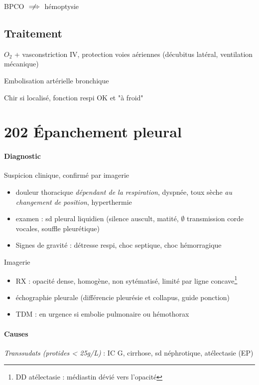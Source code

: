 \documentclass{book}
\begin{document}
\danger BPCO \(\centernot\implies\) hémoptysie

\subsection{Traitement}
\label{sec:orgaaabe04}
\(O_2\) + vasconstriction IV, protection voies aériennes (décubitus latéral,
ventilation mécanique)

Embolisation artérielle bronchique

Chir si localisé, fonction respi OK et "à froid"

\section{202 Épanchement pleural}
\label{sec:orgd27b8fa}
\paragraph{Diagnostic}
\label{sec:orgdda67ba}
Suspicion clinique, confirmé par imagerie
\begin{itemize}
\item douleur thoracique \emph{dépendant de la respiration}, dyspnée, toux sèche \emph{au
changement de position}, hyperthermie
\item examen : sd pleural liquidien (silence auscult, matité, \(\emptyset\) transmission
corde vocales, souffle pleurétique)
\item \danger Signes de gravité : détresse respi, choc septique, choc hémorragique
\end{itemize}
Imagerie
\begin{itemize}
\item RX : opacité dense, homogène, non sytématisé, limité par ligne concave\footnote{DD atélectasie : médiastin dévié vers l'opacité}
\item échographie pleurale (différencie pleurésie et collapus, guide ponction)
\item TDM : en urgence si embolie pulmonaire ou hémothorax
\end{itemize}

\paragraph{Causes}
\label{sec:org61a9b96}

\emph{Transsudats (protides < 25g/L)} : IC G, cirrhose, sd néphrotique, atélectasie (EP)
\end{document}
